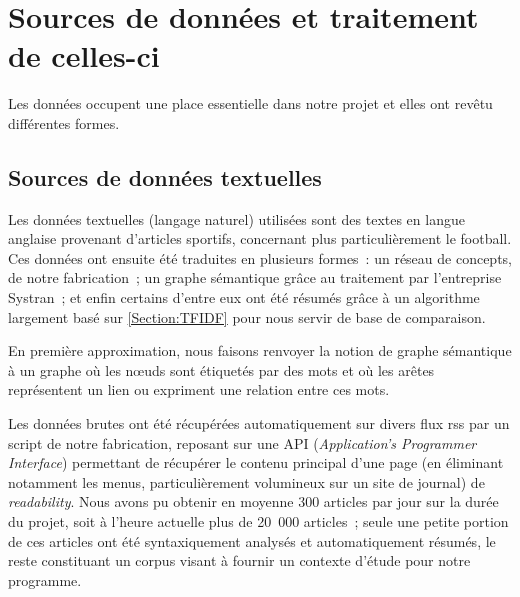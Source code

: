 \documentclass[a4paper, 12pt]{article}
\newcommand{\ang}[1]{\textit{#1}}%
\begin{document}


\section{Sources de données et traitement de celles-ci}\label{Section:sources}

Les données occupent une place essentielle dans notre projet et elles ont revêtu différentes formes.

\subsection{Sources de données textuelles}

Les données textuelles (langage naturel) utilisées sont des textes en langue anglaise provenant d'articles sportifs, concernant plus particulièrement le football. Ces données ont ensuite été traduites en plusieurs formes~: un réseau de concepts, de notre fabrication~; un graphe sémantique grâce au traitement par l'entreprise Systran~; et enfin certains d'entre eux ont été résumés grâce à un algorithme largement basé sur \ref{Section:TFIDF} pour nous servir de base de comparaison.


\begin{definition}
En première approximation, nous faisons renvoyer la notion de graphe sémantique à un graphe où les nœuds sont étiquetés par des mots et où les arêtes représentent un lien ou expriment une relation entre ces mots.
\end{definition}

Les données brutes ont été récupérées automatiquement sur divers flux rss par un script de notre fabrication, reposant sur une API (\ang{Application's Programmer Interface}) permettant de récupérer le contenu principal d'une page (en éliminant notamment les menus, particulièrement volumineux sur un site de journal) de \ang{readability}. Nous avons pu obtenir en moyenne 300 articles par jour sur la durée du projet, soit à l'heure actuelle plus de 20~000 articles~; seule une petite portion de ces articles ont été syntaxiquement analysés et automatiquement résumés, le reste constituant un corpus visant à fournir un contexte d'étude pour notre programme.
\end{document}
